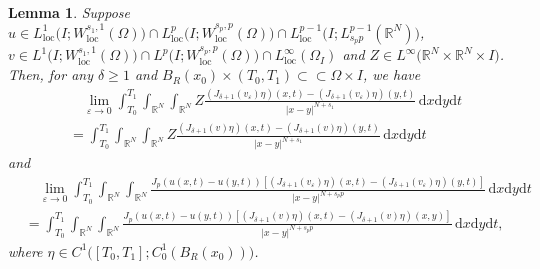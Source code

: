 \documentclass[10pt,a4paper]{amsart}
\newtheorem{lemma}{Lemma}
\begin{document}
\begin{lemma}
	\label{lem2}
	Suppose $u\in L^1_\mathrm{loc}\bigl(I;W^{s_1,1}_\mathrm{loc}(\Omega)\bigl)\cap L^p_\mathrm{loc}\bigl( I;W^{s_p,p}_\mathrm{loc}(\Omega)\bigl)\cap L^{p-1}_\mathrm{loc}\bigl( I;L^{p-1}_{s_pp}(\mathbb{R}^N)\bigl)$, $v\in L^1\bigl( I;W^{s_1,1}_\mathrm{loc}(\Omega)\bigl)\cap L^p\bigl( I;W^{s_p,p}_\mathrm{loc}(\Omega)\bigl)\cap L^\infty_\mathrm{loc}(\Omega_I)$ and $Z\in L^\infty\bigl( \mathbb{R}^N\times\mathbb{R}^N\times I\bigl) $. Then, for any $\delta\ge1$ and $B_R(x_0)\times(T_0,T_1)\subset\subset\Omega\times I$, we have
	\begin{align}
		\label{1.3}
		&\quad\lim\limits_{\varepsilon\rightarrow0}\int_{T_0}^{T_1}\int_{\mathbb{R}^N}\int_{\mathbb{R}^N}Z\frac{\left( J_{\delta+1}(v_\varepsilon)\eta\right) (x,t)-\left( J_{\delta+1}(v_\varepsilon)\eta\right) (y,t)}{|x-y|^{N+s_1}}\,\mathrm{d}x\mathrm{d}y\mathrm{d}t\nonumber\\
		&=\int_{T_0}^{T_1}\int_{\mathbb{R}^N}\int_{\mathbb{R}^N}Z\frac{\left( J_{\delta+1}(v)\eta\right) (x,t)-\left( J_{\delta+1}(v)\eta\right) (y,t)}{|x-y|^{N+s_1}}\,\mathrm{d}x\mathrm{d}y\mathrm{d}t
	\end{align}
	and
	\begin{align}
		\label{1.4}
		&\quad\lim\limits_{\varepsilon\rightarrow0}\int_{T_0}^{T_1}\int_{\mathbb{R}^N}\int_{\mathbb{R}^N}\frac{J_p\left( u(x,t)-u(y,t)\right)\left[ \left( J_{\delta+1}(v_\varepsilon)\eta\right)(x,t)-\left( J_{\delta+1}(v_\varepsilon)\eta\right)(y,t)\right]}{|x-y|^{N+s_pp}}\,\mathrm{d}x\mathrm{d}y\mathrm{d}t\nonumber\\
		&=\int_{T_0}^{T_1}\int_{\mathbb{R}^N}\int_{\mathbb{R}^N}\frac{J_p\left( u(x,t)-u(y,t)\right)\left[ \left( J_{\delta+1}(v)\eta\right)(x,t)-\left( J_{\delta+1}(v)\eta\right)(x,y)\right] }{|x-y|^{N+s_pp}}\,\mathrm{d}x\mathrm{d}y\mathrm{d}t,
	\end{align}
	where $\eta\in C^1\bigl([T_0,T_1];C^1_0(B_R(x_0))\bigl)$.
\end{lemma}
\end{document}
